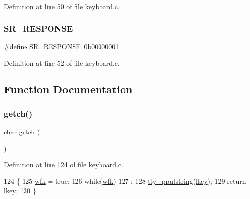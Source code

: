 Definition at line 50 of file keyboard.\+c.

\mbox{\label{a00029_ac9efa716f8185bae296975136b510c30_ac9efa716f8185bae296975136b510c30}} 
\subsubsection{\texorpdfstring{S\+R\+\_\+\+R\+E\+S\+P\+O\+N\+SE}{SR\_RESPONSE}}
{\footnotesize\ttfamily \#define S\+R\+\_\+\+R\+E\+S\+P\+O\+N\+SE~0b00000001}



Definition at line 52 of file keyboard.\+c.



\subsection{Function Documentation}
\mbox{\label{a00029_af3facad10e05defa48d45b46eb9ebe7e_af3facad10e05defa48d45b46eb9ebe7e}} 
\subsubsection{\texorpdfstring{getch()}{getch()}}
{\footnotesize\ttfamily char getch (\begin{DoxyParamCaption}{ }\end{DoxyParamCaption})}



Definition at line 124 of file keyboard.\+c.


\begin{DoxyCode}
124              \{
125     \hyperlink{a00029_a6ddd5223379778858edc46ffbec19775_a6ddd5223379778858edc46ffbec19775}{wfk} = \textcolor{keyword}{true};
126     \textcolor{keywordflow}{while}(\hyperlink{a00029_a6ddd5223379778858edc46ffbec19775_a6ddd5223379778858edc46ffbec19775}{wfk})
127         ;
128     \hyperlink{a00140_ade960b1320324706aac6c00cc6b1b2fe_ade960b1320324706aac6c00cc6b1b2fe}{tty\_pputstring}(\hyperlink{a00029_ade374650022cb30c4f5591a8dafad685_ade374650022cb30c4f5591a8dafad685}{lkey});
129     \textcolor{keywordflow}{return} \hyperlink{a00029_ade374650022cb30c4f5591a8dafad685_ade374650022cb30c4f5591a8dafad685}{lkey};
130 \}
\end{DoxyCode}
\mbox{\label{a00029_ab88a2e96bbe585e228a5b201435c0240_ab88a2e96bbe585e228a5b201435c0240}} 
